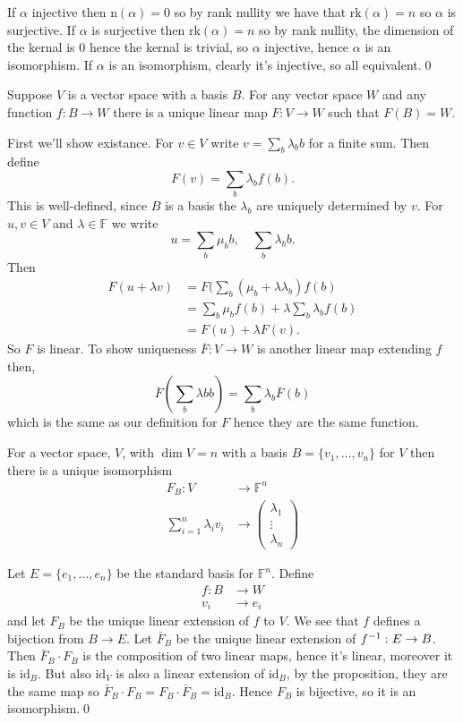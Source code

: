 \documentclass{article}
\newcommand{\F}{\mathbb{F}}
\newcommand{\n}{\mathrm{n}}
\newcommand{\rk}{\mathrm{rk}}
\begin{document}
\pf If $ \alpha $ injective then $ \n(\alpha)=0 $ so by rank nullity we have that $ \rk(\alpha)=n $ so $ \alpha $ is surjective. If $ \alpha $ is surjective then $ \rk(\alpha)=n $ so by rank nullity, the dimension of the kernal is $ 0 $ hence the kernal is trivial, so $ \alpha $ injective, hence $ \alpha $ is an isomorphism. If $ \alpha $ is an isomorphism, clearly it's injective, so all equivalent.\qed
\begin{proposition}
  Suppose $ V $ is a vector space with a basis $ B $. For any vector space $ W	 $ and any function $ f:B\to W $ there is a unique linear map $ F:V\to W $ such that $ F(B)=W $.
\end{proposition}
\pf First we'll show existance. For $ v\in V $ write $ v=\sum_b\lambda_bb $ for a finite sum. Then define
\[
  F(v)=\sum_b \lambda_bf(b).
\]
This is well-defined, since $ B $ is a basis the $ \lambda_b $ are uniquely determined by $ v $. For $ u,v\in V $ and $ \lambda\in \F $ we write
\[
  u=\sum_b\mu_bb,\quad \sum_b\lambda_bb.
\]
Then \begin{align*}
	F(u+\lambda v)&=F(\sum_b(\mu_b+\lambda\lambda_b)f(b)\\
		     &= \sum_b\mu_bf(b)+\lambda\sum_b\lambda_bf(b)\\
		     &= F(u)+\lambda F(v).
\end{align*}
So $ F $ is linear. To show uniqueness $ \overline F:V\to W $ is another linear map extending $ f $ then,
\[
  \overline F\left(\sum_b\lambda bb\right)=\sum_b\lambda_b\overline F(b)
\]
which is the same as our definition for $ F $ hence they are the same function.
\begin{corollary}
	For a vector space, $ V $, with $ \dim V=n $ with a basis $ B=\{v_1,\dots, v_n\} $ for $ V $ then there is a unique isomorphism
  \begin{align*}
	  F_B:V&\to \F^n\\
	       \sum_{i=1}^n\lambda_iv_i &\to \begin{pmatrix}
	        \lambda_1\\
		\vdots \\
		\lambda_n
	      \end{pmatrix}
  \end{align*}
  \end{corollary}
  \pf Let $ E=\{e_1,\dots, e_n\} $ be the standard basis for $ \F^n $. Define
  \begin{align*}
	  f:B&\to W\\
	  v_i&\to e_i
  \end{align*}
  and let $ F_B $ be the unique linear extension of $ f $ to $ V $. We see that $ f $ defines a bijection from $ B\to E $. Let $ \bar F_B $ be the unique linear extension of $ {f}^{-1}:E\to B $. Then $ \bar F_B\cdot F_B $ is the composition of two linear maps, hence it's linear, moreover it is $ \mathrm{id}_B $. But also $ \mathrm{id}_V $ is also a linear extension of $ \mathrm{id}_B $, by the proposition, they are the same map so $ \bar F_B\cdot F_B=F_B\cdot \bar F_B=\mathrm{id}_B $. Hence $ F_B $ is bijective, so it is an isomorphism.\qed
\end{document}
